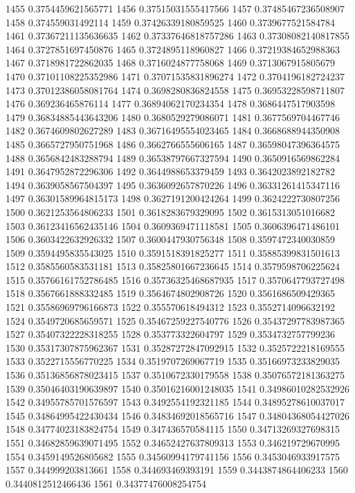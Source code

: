 1455 0.3754459621565771
1456 0.37515031555417566
1457 0.37485467236508907
1458 0.374559031492114
1459 0.37426339180859525
1460 0.3739677521584784
1461 0.37367211135636635
1462 0.37337646818757286
1463 0.37308082140817855
1464 0.3727851697450876
1465 0.3724895118960827
1466 0.37219384652988363
1467 0.3718981722862035
1468 0.3716024877758068
1469 0.3713067915805679
1470 0.37101108225352986
1471 0.37071535831896274
1472 0.3704196182724237
1473 0.37012386058081764
1474 0.3698280836824558
1475 0.36953228598711807
1476 0.369236465876114
1477 0.36894062170234354
1478 0.3686447517903598
1479 0.36834885443643206
1480 0.3680529279086071
1481 0.3677569704467746
1482 0.3674609802627289
1483 0.36716495554023465
1484 0.3668688944350908
1485 0.3665727950751968
1486 0.3662766555606165
1487 0.36598047396364575
1488 0.3656842483288794
1489 0.36538797667327594
1490 0.3650916569862284
1491 0.3647952872296306
1492 0.3644988653379459
1493 0.3642023892182782
1494 0.3639058567504397
1495 0.3636092657870226
1496 0.36331261415347116
1497 0.36301589964815173
1498 0.3627191200424264
1499 0.3624222730807256
1500 0.3621253564806233
1501 0.3618283679329095
1502 0.3615313051016682
1503 0.36123416562435146
1504 0.3609369471118581
1505 0.3606396471486101
1506 0.3603422632926332
1507 0.3600447930756348
1508 0.3597472340030859
1509 0.3594495835543025
1510 0.3591518391825277
1511 0.35885399831501613
1512 0.3585560583531181
1513 0.35825801667236645
1514 0.3579598706225624
1515 0.35766161752786485
1516 0.35736325468687935
1517 0.3570647793727498
1518 0.3567661888332485
1519 0.3564674802908726
1520 0.3561686509429365
1521 0.35586969796166873
1522 0.355570618494312
1523 0.3552714096632192
1524 0.3549720685659571
1525 0.35467259227540776
1526 0.35437297783987365
1527 0.35407322228318255
1528 0.353773322604797
1529 0.3534732757799236
1530 0.35317307875962367
1531 0.35287272847092915
1532 0.3525722218169555
1533 0.3522715556770225
1534 0.3519707269067719
1535 0.35166973233829035
1536 0.35136856878023415
1537 0.3510672330179558
1538 0.35076572181363275
1539 0.35046403190639897
1540 0.35016216001248035
1541 0.34986010282532926
1542 0.34955785701576597
1543 0.3492554192321185
1544 0.34895278610037017
1545 0.34864995422430434
1546 0.34834692018565716
1547 0.34804368054427026
1548 0.34774023183824754
1549 0.347436570584115
1550 0.34713269327698315
1551 0.34682859639071495
1552 0.34652427637809313
1553 0.346219729670995
1554 0.3459149526805682
1555 0.34560994179741156
1556 0.3453046933917575
1557 0.344999203813661
1558 0.344693469393191
1559 0.3443874864406233
1560 0.3440812512466436
1561 0.34377476008254754
